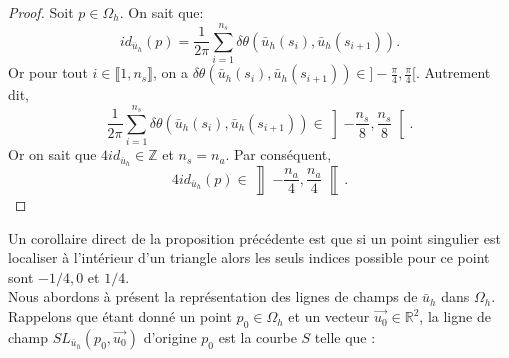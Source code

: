 \begin{proof}
Soit $p\in\Omega_h$. On sait que:
$$
id_{\bar{u}_h}(p)=\displaystyle\frac{1}{2\pi}\sum_{i=1}^{n_s}\delta\theta(\bar{u}_h(s_i),\bar{u}_h(s_{i+1})).
$$
Or pour tout $i\in\llbracket 1, n_s\rrbracket$, on a $\delta\theta(\bar{u}_h(s_i),\bar{u}_h(s_{i+1}))\in]-\frac{\pi}{4}, \frac{\pi}{4}[$. Autrement dit,
$$
\displaystyle\frac{1}{2\pi}\sum_{i=1}^{n_s}\delta\theta(\bar{u}_h(s_i),\bar{u}_h(s_{i+1}))\in\left]-\frac{n_s}{8}, \frac{n_s}{8}\right[.
$$
Or on sait que $4id_{\bar{u}_h}\in\mathbb{Z}$ et $n_s=n_a$. Par conséquent,
$$
4id_{\bar{u}_h}(p)\in\left\rrbracket-\frac{n_a}{4}, \frac{n_a}{4}\right\llbracket.
$$
\end{proof}
Un corollaire direct de la proposition précédente est que si un point singulier est localiser à l'intérieur d'un triangle alors les seuls indices possible pour ce point sont $-1/4, 0$ et $1/4$.\\

Nous abordons à présent la représentation des lignes de champs de $\bar{u}_h$ dans $\Omega_h$. Rappelons que étant donné un point $p_0\in\Omega_h$ et un vecteur $\overrightarrow{u_0}\in\mathbb{R}^2$, la ligne de champ $SL_{\bar{u}_h}(p_0, \overrightarrow{u_0})$ d'origine $p_0$ est la courbe $S$ telle que :

